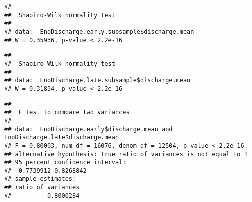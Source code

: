 \documentclass[
]{article}
\newenvironment{Shaded}{\begin{snugshade}}{\end{snugshade}}
\newcommand{\CommentTok}[1]{\textcolor[rgb]{0.56,0.35,0.01}{\textit{#1}}}
\newcommand{\KeywordTok}[1]{\textcolor[rgb]{0.13,0.29,0.53}{\textbf{#1}}}
\newcommand{\NormalTok}[1]{#1}
\newcommand{\OperatorTok}[1]{\textcolor[rgb]{0.81,0.36,0.00}{\textbf{#1}}}
\begin{document}
\begin{verbatim}
## 
##  Shapiro-Wilk normality test
## 
## data:  EnoDischarge.early.subsample$discharge.mean
## W = 0.35936, p-value < 2.2e-16
\end{verbatim}

\begin{Shaded}
\end{Shaded}

\begin{verbatim}
## 
##  Shapiro-Wilk normality test
## 
## data:  EnoDischarge.late.subsample$discharge.mean
## W = 0.31834, p-value < 2.2e-16
\end{verbatim}

\begin{Shaded}
\end{Shaded}

\begin{verbatim}
## 
##  F test to compare two variances
## 
## data:  EnoDischarge.early$discharge.mean and EnoDischarge.late$discharge.mean
## F = 0.80003, num df = 16076, denom df = 12504, p-value < 2.2e-16
## alternative hypothesis: true ratio of variances is not equal to 1
## 95 percent confidence interval:
##  0.7739912 0.8268842
## sample estimates:
## ratio of variances 
##          0.8000284
\end{verbatim}

\begin{Shaded}
\end{Shaded}
\end{document}
